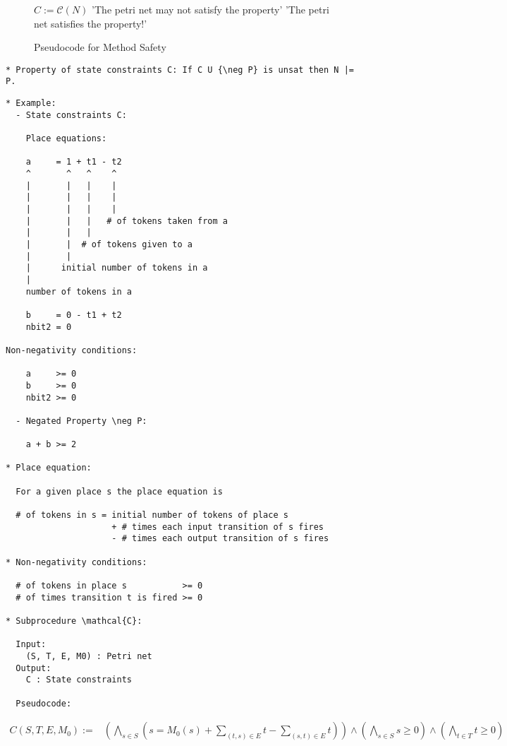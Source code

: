 \documentclass{llncs}
\begin{document}
\begin{figure}
\begin{algorithmic}[1]
\State $C := \mathcal C(N)$
  \State \Return 'The petri net may not satisfy the property'
\Else
  \State \Return 'The petri net satisfies the property!'
\EndIf
\end{algorithmic}
\caption{Pseudocode for Method Safety}
\label{fig:method-safety-pseudocode}
\end{figure}

\begin{verbatim}
* Property of state constraints C: If C U {\neg P} is unsat then N |= P.
\end{verbatim}

\newpage

\begin{verbatim}
* Example:
  - State constraints C:

    Place equations:
  
    a     = 1 + t1 - t2
    ^       ^   ^    ^
    |       |   |    |
    |       |   |    |
    |       |   |    |
    |       |   |   # of tokens taken from a
    |       |   |    
    |       |  # of tokens given to a
    |       |
    |      initial number of tokens in a
    |
    number of tokens in a

    b     = 0 - t1 + t2
    nbit2 = 0
    
Non-negativity conditions:
  
    a     >= 0
    b     >= 0
    nbit2 >= 0

  - Negated Property \neg P:

    a + b >= 2

* Place equation:
  
  For a given place s the place equation is

  # of tokens in s = initial number of tokens of place s
                     + # times each input transition of s fires
                     - # times each output transition of s fires

* Non-negativity conditions:

  # of tokens in place s           >= 0
  # of times transition t is fired >= 0

* Subprocedure \mathcal{C}:

  Input:
    (S, T, E, M0) : Petri net
  Output:
    C : State constraints

  Pseudocode:

  \end{verbatim}
\begin{align*}
  C(S, T, E, M_0) :=& \left( \bigwedge_{s \in S} \left(
    s = M_0(s) + \sum_{(t, s) \in E} t - \sum_{(s, t) \in E} t
  \right) \right) \land
    \left( \bigwedge_{s \in S} s \ge 0 \right) \land
    \left( \bigwedge_{t \in T} t \ge 0 \right)
\end{align*}
\end{document}
